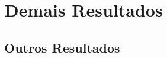 

\chapter{\Large{Demais Resultados}}\label{chp:5}


\section{{Outros Resultados}}


\subsection{{}}
